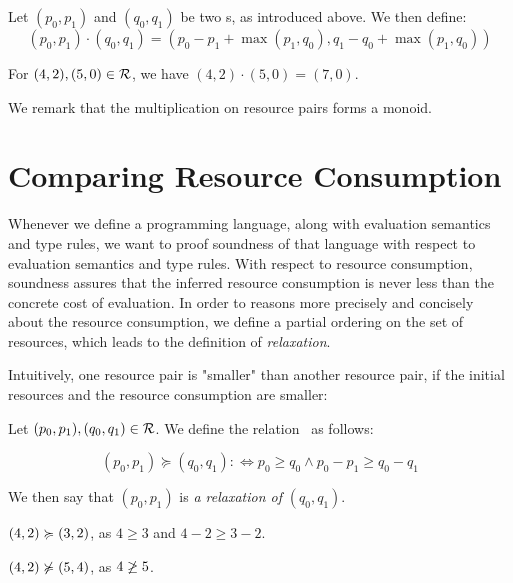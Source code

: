 \begin{definition}
   \label{def:multiplying-pairs}
   Let \((p_0, p_1)\) and \((q_0, q_1)\) be two s, as introduced above. We then define:
   \[(p_0, p_1) \cdot (q_0, q_1) = (p_0 - p_1 + \max(p_1, q_0), q_1 - q_0 + \max(p_1, q_0))\]
\end{definition}

\begin{example}
   For \((4, 2), (5,0) \in \mathcal{R}\), we have \((4, 2) \cdot (5, 0) = (7,0)\).
\end{example}

We remark that the multiplication on resource pairs forms a monoid.

\section{Comparing Resource Consumption}

Whenever we define a programming language, along with evaluation semantics and type rules, we want to proof soundness of that language with respect to evaluation semantics and type rules. With respect to resource consumption, soundness assures that the inferred resource consumption is never less than the concrete cost of evaluation. In order to reasons more precisely and concisely about the resource consumption, we define a partial ordering on the set of resources, which leads to the definition of \emph{relaxation}.

Intuitively, one resource pair is "smaller" than another resource pair, if the initial resources and the resource consumption are smaller:

\begin{definition}
   Let \((p_0, p_1), (q_0, q_1) \in \mathcal{R}\). We define the relation \relaxation ~as follows:

   \[
      (p_0, p_1) \succcurlyeq (q_0, q_1) :\iff p_0 \geq q_0 \wedge p_0 - p_1 \geq q_0 - q_1
   \]
\end{definition}

We then say that \((p_0, p_1)\) is \emph{a relaxation of} \((q_0, q_1)\).

\begin{example}
   \((4, 2) \succcurlyeq (3, 2)\), as \(4 \geq 3\) and \(4 - 2 \geq 3 - 2\).
\end{example}

\begin{example}
   \((4,2) \notrelaxation (5, 4)\), as \(4 \centernot \geq 5\).
\end{example}

